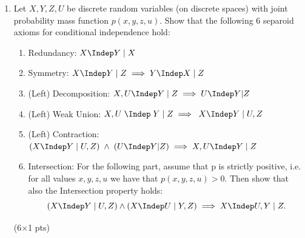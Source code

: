 \begin{enumerate}
Check if $X$ is conditionally independent of $Y$ given $Z$. Provide the steps through your derivations. (1pt)
\begin{gradedsolution}
Given a rank one matrix $M$ with factorization $M=vw^T$, all other factorizations are related to this factorization by $M=(v \lambda)(w / \lambda)^T$ for $\lambda \in \mathbb{R}\setminus\{0\}$. Choose $\lambda$ such that $\sum v_i=1$. Then if $M$ is normalized, $1=\sum_{ij}M_{ij}=\sum_{ij}v_iw_j=\sum_jw_j$, $w$ is also normalized. Consequently, $v_i=v_i \sum_j w_j = \sum_j M_{ij}$ and $w_j= w_j \sum_i v_i = \sum_i M_{ij} $. If $M$ is non-negative, then $v$ and $w$ are also non-negative. Hence, $v$ and $w$ are the marginals of $M$.

Hence, for any joint distribution $P(X, Y|Z=z)$, we only need to check if the matrix $p(x, y|z)$ is rank-one, as it can then be written as $p(x,y|z)=p(x|z)p(y|z)$. This is here the case.

Alternatively, it's easy to read off $p(x|z)$ and $p(y|z)$ from the joint distribution and verify $p(x,y|z)=p(x|z)p(y|z)$.
\end{gradedsolution}

\item Let $X,Y,Z,U$ be discrete random variables (on discrete spaces) with joint probability mass function $p(x,y,z,u)$. Show that the following 6 separoid axioms for conditional independence hold:

\begin{enumerate}
\item Redundancy: $X \Indep Y \;|\; X$

\item Symmetry: $X \Indep Y\; |\; Z \implies Y \Indep X\; |\; Z$ 

\item (Left) Decomposition: $X, U \Indep Y \; | \; Z \implies U \Indep Y | Z\; $

\item (Left) Weak Union: $X,U \;\Indep \;  Y \; | \; Z \implies  \; X \Indep Y \; |\; U,Z $

\item (Left) Contraction: $(X \Indep Y\; |\; U, Z) \; \land \; (U \Indep Y | Z) \implies X, U \Indep Y \; | \; Z$ \\

\item Intersection: For the following part, assume that p is strictly positive, i.e. for all values $x,y,z,u$ we have that $p(x, y, z, u) > 0$. Then show that also the Intersection property holds:
$$(X \Indep Y \;|\;U,Z) \land (X \Indep U \; | \; Y,Z)  \implies  X \Indep U,Y \; | \; Z.$$
\end{enumerate}
(6$\times$1 pts)\\
\end{enumerate}

